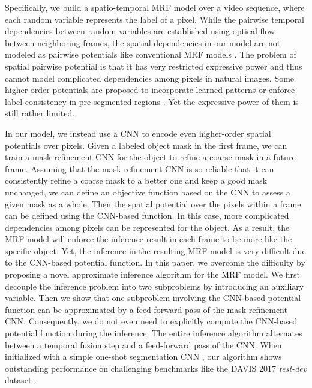 \documentclass[10pt,twocolumn,letterpaper]{article}
\begin{document}
Specifically, we build a spatio-temporal MRF model over a video sequence, where each random variable represents the label of a pixel.
While the pairwise temporal dependencies between random variables are established using optical flow between neighboring frames,
the spatial dependencies in our model are not modeled as pairwise potentials like conventional MRF models \cite{shotton2009textonboost,koller2009probabilistic,baoyuanwu-cvpr-2013,baoyuanwu-iccv-2013,baoyuanwu-pr-2017}.
The problem of spatial pairwise potential is that it has very restricted expressive power and thus cannot model complicated
dependencies among pixels in natural images. Some higher-order potentials are proposed to incorporate learned patterns \cite{roth2005fields} or enforce
label consistency in pre-segmented regions \cite{kohli2009robust,arnab2016higher}. Yet the expressive power of them is still rather limited.

In our model, we instead use a CNN to encode even higher-order spatial potentials over pixels.
Given a labeled object mask in the first frame, we can train a mask refinement CNN for the object
to refine a coarse mask in a future frame.
Assuming that the mask refinement CNN is so reliable that it can consistently refine a coarse
mask to a better one and keep a good mask unchanged,
we can define an objective function based on the CNN to assess a given mask as a whole.
Then the spatial potential over the pixels within a frame can be defined using the CNN-based function.
In this case, more complicated dependencies among pixels can be represented for the object.
As a result, the MRF model will enforce the inference result
in each frame to be more like the specific object.
Yet, the inference in the resulting MRF model is very difficult due to the CNN-based potential function.
In this paper, we overcome the difficulty by proposing a novel approximate inference algorithm for the MRF model.
We first decouple the inference problem into two subproblems by introducing an auxiliary variable.
Then we show that one subproblem involving the CNN-based potential function can be approximated by a feed-forward pass of the mask refinement CNN.
Consequently, we do not even need to explicitly compute the CNN-based potential function during the inference.
The entire inference algorithm alternates between a temporal fusion step and a feed-forward pass of the CNN.
When initialized with a simple one-shot segmentation CNN \cite{caelles2017one},
our algorithm shows outstanding performance on challenging benchmarks like the DAVIS 2017 \emph{test-dev} dataset \cite{PontTuset2017davischallenge}.
\end{document}
